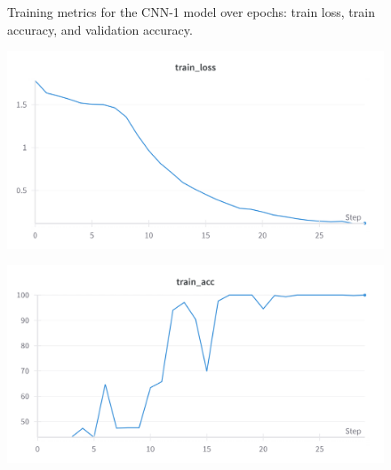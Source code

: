 \documentclass{article}
\begin{document}
\begin{figure}[t]
    \caption{Training metrics for the CNN-1 model over epochs: train loss, train accuracy, and validation accuracy.}
    \label{fig:cnn1_training_metrics}
\end{figure}

\begin{figure}[t]
    \centering

    \begin{minipage}{0.6\textwidth}
        \centering
        \includegraphics[width=\textwidth]{Images/cnn2_train_loss.png}
        \label{fig:cnn2_train_loss}
    \end{minipage}

    \vspace*{0.4cm}

    \begin{minipage}{0.6\textwidth}
        \centering
        \includegraphics[width=\textwidth]{Images/cnn2_train_acc.png}
        \label{fig:cnn2_train_acc}
    \end{minipage}

    \vspace*{0.4cm}


\end{figure}
\end{document}
